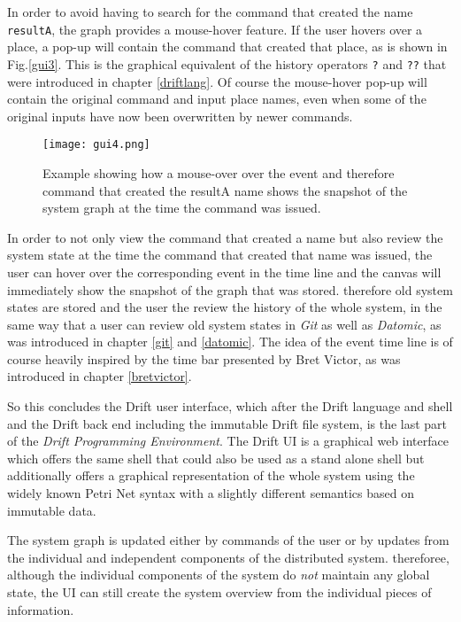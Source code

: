 In order to avoid having to search for the command that created
the name \texttt{resultA}, the graph provides a mouse-hover feature.
If the user hovers over a place, a pop-up will contain the command that
created that place, as is shown in Fig.\ref{gui3}. This is the graphical
equivalent of the history operators \texttt{?} and \texttt{??}
that were introduced in chapter \ref{driftlang}. Of course the
mouse-hover pop-up will contain the original command and input
place names, even when some of the original inputs have now been
overwritten by newer commands.

\begin{figure}[h]
  \texttt{[image: gui4.png]}
  \caption{Example showing how a mouse-over over the event
           and therefore command that created the resultA name
           shows the snapshot of the system graph at the time
           the command was issued.}
  \label{gui4}
\end{figure}

In order to not only view the command that created a name
but also review the system state at the time the command
that created that name was issued, the user can hover over
the corresponding event in the time line and the canvas
will immediately show the snapshot of the graph that was
stored. therefore old system states are stored and the
user the review the history of the whole system, in the
same way that a user can review old system states in
\textit{Git} as well as \textit{Datomic}, as was introduced
in chapter \ref{git} and \ref{datomic}. The idea of the
event time line is of course heavily inspired by the
time bar presented by Bret Victor, as was introduced in
chapter \ref{bretvictor}.
\newline

So this concludes the Drift user interface, which after
the Drift language and shell and the Drift back end including
the immutable Drift file system, is the last part of the
\textit{Drift Programming Environment}. The Drift UI is
a graphical web interface which offers the same shell that
could also be used as a stand alone shell but additionally
offers a graphical representation of the whole system
using the widely known Petri Net syntax with a slightly
different semantics based on immutable data.

The system graph is updated either by commands of the
user or by updates from the individual and independent
components of the distributed system. thereforee,
although the individual components of the system do
\textit{not} maintain any global state, the UI can still
create the system overview from the individual pieces
of information.

